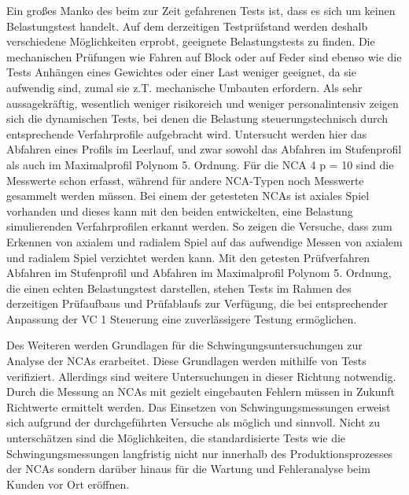 Ein großes Manko des beim zur Zeit gefahrenen Tests ist, dass es sich um keinen Belastungstest handelt. Auf dem derzeitigen Testprüfstand werden deshalb verschiedene Möglichkeiten erprobt, geeignete Belastungstests zu finden. Die mechanischen Prüfungen wie Fahren auf Block oder auf Feder sind ebenso wie die Tests Anhängen eines Gewichtes oder einer Last weniger geeignet, da sie aufwendig sind, zumal sie z.T. mechanische Umbauten erfordern. Als sehr aussagekräftig, wesentlich weniger risikoreich und weniger personalintensiv zeigen sich die dynamischen Tests, bei denen die Belastung steuerungstechnisch durch entsprechende Verfahrprofile aufgebracht wird. Untersucht werden hier das Abfahren eines Profils im Leerlauf, und zwar sowohl das Abfahren im Stufenprofil als auch im Maximalprofil Polynom 5. Ordnung. Für die NCA 4 p = 10 sind die Messwerte schon erfasst, während für andere NCA-Typen noch Messwerte gesammelt werden müssen. Bei einem der getesteten NCAs ist axiales Spiel vorhanden und dieses kann mit den beiden entwickelten, eine Belastung simulierenden Verfahrprofilen erkannt werden.  So zeigen die Versuche, dass zum Erkennen von axialem und radialem Spiel auf das aufwendige Messen von axialem und radialem Spiel verzichtet werden kann. Mit den getesten Prüfverfahren Abfahren im Stufenprofil und Abfahren im Maximalprofil Polynom 5. Ordnung, die einen echten Belastungstest darstellen, stehen Tests im Rahmen des derzeitigen Prüfaufbaus und Prüfablaufs zur Verfügung, die bei entsprechender Anpassung der VC 1 Steuerung eine zuverlässigere Testung ermöglichen.
 








Des Weiteren werden Grundlagen für die Schwingungsuntersuchungen zur Analyse der NCAs erarbeitet. Diese Grundlagen werden mithilfe von Tests verifiziert. Allerdings sind weitere Untersuchungen in dieser Richtung notwendig. Durch die Messung an NCAs mit gezielt eingebauten Fehlern müssen in Zukunft Richtwerte ermittelt werden. Das Einsetzen von Schwingungsmessungen erweist sich aufgrund der durchgeführten Versuche als möglich und sinnvoll. Nicht zu unterschätzen sind die Möglichkeiten, die standardisierte Tests wie die Schwingungsmessungen langfristig nicht nur innerhalb des Produktionsprozesses der NCAs sondern darüber hinaus für die Wartung und Fehleranalyse beim Kunden vor Ort eröffnen.

